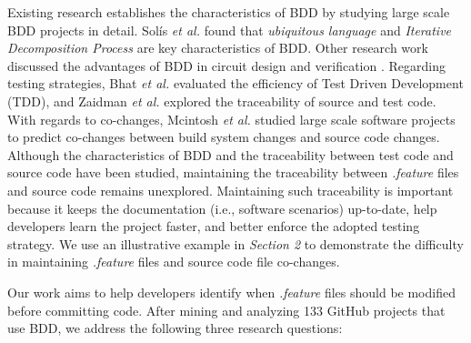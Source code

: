 Existing research establishes the characteristics of BDD by studying large scale BDD projects in detail. Solís \textit{et al.} \cite{solis2011study} found that \textit{ubiquitous language} and \textit{Iterative Decomposition Process} are key characteristics of BDD. Other research work discussed the advantages of BDD in circuit design and verification \cite{diepenbeck2012behavior}. Regarding testing strategies, Bhat \textit{et al.} \cite{bhat2006evaluating} evaluated the efficiency of Test Driven Development (TDD), and Zaidman \textit{et al.} \cite{zaidman2008mining} explored the traceability of source and test code. With regards to co-changes, Mcintosh \textit{et al.} \cite{mcintosh2014mining} studied large scale software projects to predict co-changes between build system changes and source code changes. Although the characteristics of BDD and the traceability between test code and source code have been studied, maintaining the traceability between \textit{.feature} files and source code remains unexplored. Maintaining such traceability is important because it keeps the documentation (i.e., software scenarios) up-to-date, help developers learn the project faster, and better enforce the adopted testing strategy. We use an illustrative example in \textit{Section 2} to demonstrate the difficulty in maintaining \textit{.feature} files and source code file co-changes.

Our work aims to help developers identify when \textit{.feature} files should be modified before committing code. After mining and analyzing 133 GitHub projects that use BDD, we address the following three research questions:

